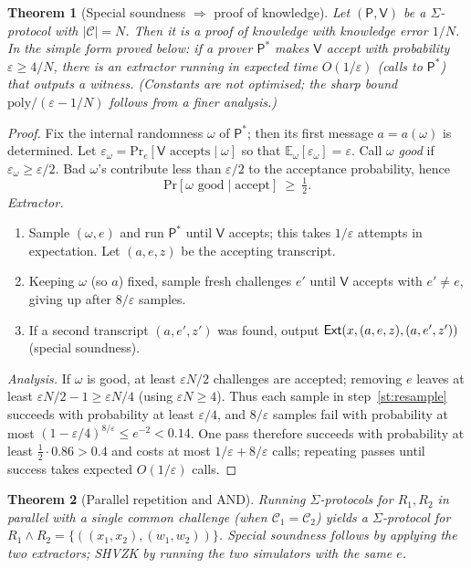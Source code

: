 \documentclass[11pt,a4paper]{report}
\theoremstyle{plain}
\newtheorem{theorem}{Theorem}[chapter]
\theoremstyle{definition}
\theoremstyle{remark}
\newcommand{\poly}{\mathrm{poly}}
\renewcommand{\Pr}{\mathrm{Pr}}
\newcommand{\Prv}{\mathsf{P}}\newcommand{\Ver}{\mathsf{V}}
\begin{document}
\begin{theorem}[Special soundness $\Rightarrow$ proof of knowledge]\label{thm:ss2pok}
Let $(\Prv,\Ver)$ be a $\Sigma$-protocol with $|\mathcal C|=N$. Then it is a proof of knowledge with knowledge error $1/N$. In the simple form proved below: if a prover $\Prv^*$ makes $\Ver$ accept with probability $\varepsilon\ge4/N$, there is an extractor running in expected time $O(1/\varepsilon)$ (calls to $\Prv^*$) that outputs a witness. (Constants are not optimised; the sharp bound $\poly/(\varepsilon-1/N)$ follows from a finer analysis.)
\end{theorem}
\begin{proof}
Fix the internal randomness $\omega$ of $\Prv^*$; then its first message $a=a(\omega)$ is determined. Let $\varepsilon_\omega=\Pr_e[\Ver\text{ accepts}\mid\omega]$ so that $\mathbb E_\omega[\varepsilon_\omega]=\varepsilon$. Call $\omega$ \emph{good} if $\varepsilon_\omega\ge\varepsilon/2$. Bad $\omega$'s contribute less than $\varepsilon/2$ to the acceptance probability, hence
\[\Pr[\omega\text{ good}\mid\text{accept}]\ \ge\ \tfrac12.\]
\emph{Extractor.}
\begin{enumerate}
\item Sample $(\omega,e)$ and run $\Prv^*$ until $\Ver$ accepts; this takes $1/\varepsilon$ attempts in expectation. Let $(a,e,z)$ be the accepting transcript.
\item\label{st:resample} Keeping $\omega$ (so $a$) fixed, sample fresh challenges $e'$ until $\Ver$ accepts with $e'\ne e$, giving up after $8/\varepsilon$ samples.
\item If a second transcript $(a,e',z')$ was found, output $\mathsf{Ext}(x,(a,e,z),(a,e',z'))$ (special soundness).
\end{enumerate}
\emph{Analysis.} If $\omega$ is good, at least $\varepsilon N/2$ challenges are accepted; removing $e$ leaves at least $\varepsilon N/2-1\ge\varepsilon N/4$ (using $\varepsilon N\ge4$). Thus each sample in step~\ref{st:resample} succeeds with probability at least $\varepsilon/4$, and $8/\varepsilon$ samples fail with probability at most $(1-\varepsilon/4)^{8/\varepsilon}\le e^{-2}<0.14$. One pass therefore succeeds with probability at least $\tfrac12\cdot0.86>0.4$ and costs at most $1/\varepsilon+8/\varepsilon$ calls; repeating passes until success takes expected $O(1/\varepsilon)$ calls.
\end{proof}

\begin{theorem}[Parallel repetition and AND]
Running $\Sigma$-protocols for $R_1,R_2$ in parallel with a \emph{single} common challenge (when $\mathcal C_1=\mathcal C_2$) yields a $\Sigma$-protocol for $R_1\wedge R_2=\{((x_1,x_2),(w_1,w_2))\}$. Special soundness follows by applying the two extractors; SHVZK by running the two simulators with the same $e$.
\end{theorem}
\end{document}
